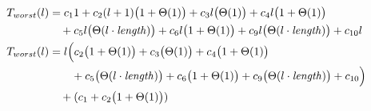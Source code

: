 \begin{subequations}
\label{eq:mergelines-all}
\begin{align}
\label{eq:mergelines-all-1}
T_{worst}(l)& =
c_{1}1
+ c_{2}(l+1)\bigl(1 + \Theta(1)\bigr)
+ c_{3}l\bigl(\Theta(1)\bigr)
+ c_{4}l\bigl(1 + \Theta(1)\bigr)
\\
& \quad
+ c_{5}l\bigl(\Theta(l \cdot \mathit{length})\bigr)
+ c_{6}l\bigl(1 + \Theta(1)\bigr)
+ c_{9}l\bigl(\Theta(l \cdot \mathit{length})\bigr)
+ c_{10}l
\nonumber \\
\label{eq:mergelines-all-2}
T_{worst}(l)& =
l\Bigl(c_{2}\bigl(1 + \Theta(1)\bigr) + c_{3}\bigl(\Theta(1)\bigr) + c_{4}\bigl(1 + \Theta(1)\bigr)
\\
& \quad \quad
 + c_{5}\bigl(\Theta(l \cdot \mathit{length})\bigr) + c_{6}\bigl(1 + \Theta(1)\bigr) + c_{9}\bigl(\Theta(l \cdot \mathit{length})\bigr) + c_{10}\Bigl)
\nonumber \\
& \quad
+ (c_{1} + c_{2}\bigl(1 + \Theta(1)\bigr))
\nonumber
\end{align}
\end{subequations}
